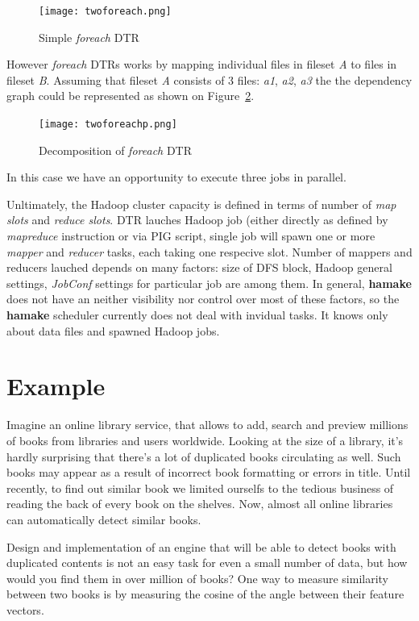 \documentclass{article}
\begin{document}
\begin{figure}[htp]
\centering
\texttt{[image: twoforeach.png]}
\caption{Simple \emph{foreach} DTR}
\label{fig:foreach1}
\end{figure}

However \emph{foreach} DTRs works by mapping individual files in
fileset \textit{A} to files in fileset \textit{B}. Assuming that
fileset \textit{A} consists of 3 files: \textit{a1}, \textit{a2},
\textit{a3} the the dependency graph could be represented as shown on
Figure~\ref{fig:foreach2}.

\begin{figure}[htp]
\centering
\texttt{[image: twoforeachp.png]}
\caption{Decomposition of \emph{foreach} DTR}
\label{fig:foreach2}
\end{figure}

In this case we have an opportunity to execute three jobs in parallel.

Unltimately, the Hadoop cluster capacity is defined in terms of number
of \textit{map slots} and \textit{reduce slots}.  DTR lauches Hadoop
job (either directly as defined by \emph{mapreduce} instruction or via
PIG script, single job will spawn one or more \emph{mapper} and
\emph{reducer} tasks, each taking one respecive slot. Number of
mappers and reducers lauched depends on many factors: size of DFS
block, Hadoop general settings, \emph{JobConf} settings for particular
job are among them. In general, \textbf{hamake} does not have an neither
visibility nor control over most of these factors, so the \textbf{hamake}
scheduler currently does not deal with invidual tasks. It knows only
about data files and spawned Hadoop jobs.

\section{Example}

Imagine an online library service, that allows to add, search and preview millions
of books from libraries and users worldwide. Looking at the size of a library, it's hardly 
surprising that there's a lot of duplicated books circulating as well. Such books may appear as a result
of incorrect book formatting or errors in title. Until recently, to find
out similar book we limited ourselfs to the tedious business of reading the back 
of every book on the shelves. Now, almost all online libraries can automatically detect similar books. 

Design and implementation of an engine that will be able to detect books with duplicated contents is not an 
easy task for even a small number of data, but how would you find them in over million of books?
One way to measure similarity between two books is by measuring the cosine of the angle between their feature vectors\cite{wiki:cosinesimilarity}.
\end{document}
